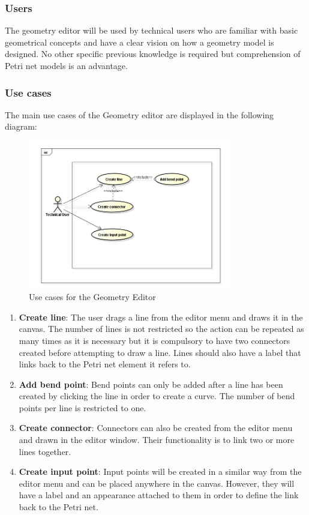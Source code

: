 \subsubsection{Users}
The geometry editor will be used by technical users who are familiar with basic geometrical concepts and have a clear vision on how a geometry model is designed. No other specific previous knowledge is required but comprehension of Petri net models is an advantage.
\subsubsection{Use cases}
The main use cases of the Geometry editor are displayed in the following diagram:

\begin{figure}[htp]
\begin{center}
  \includegraphics[width=0.8\textwidth]{image/GeometryUC.png}
  \caption{Use cases for the Geometry Editor}
  \label{fig:geometry_editor_usecases}
\end{center}
\end{figure}

\begin{enumerate}
	\item \textbf{Create line}: The user drags a line from the editor menu and draws it in the canvas. The number of lines is not restricted so the action can be repeated as many times as it is necessary but it is compulsory to have two connectors created before attempting to draw a line. Lines should also have a label that links back to the Petri net element it refers to.
	\item \textbf{Add bend point}: Bend points can only be added after a line has been created by clicking the line in order to create a curve. The number of bend points per line is restricted to one.
\item \textbf{Create connector}: Connectors can also be created from the editor menu and drawn in the editor window. Their functionality is to link two or more lines together. 
\item \textbf{Create input point}: Input points will be created in a similar way from the editor menu and can be placed anywhere in the canvas. However, they will have a label and an appearance attached to them in order to define the link back to the Petri net.   
\end{enumerate}

